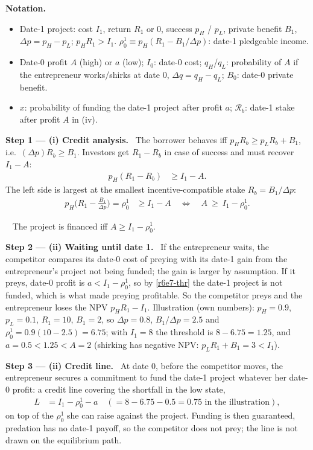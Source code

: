 \documentclass[11pt,a4paper]{article}
\newcommand{\notation}{\par\noindent\textbf{Notation.}}
\newcommand{\step}[2]{\par\medskip\noindent\textbf{Step #1 --- #2.}~}
\newcommand{\answer}[1]{\par\smallskip\noindent\fbox{\textbf{Answer #1.}}~}
\begin{document}
\notation
\begin{itemize}
  \item Date-1 project: cost $I_1$, return $R_1$ or 0, success $p_H$ / $p_L$, private benefit $B_1$, $\Delta p=p_H-p_L$; $p_HR_1>I_1$. $\rho_0^1\equiv p_H(R_1-B_1/\Delta p)$: date-1 pledgeable income.
  \item Date-0 profit $A$ (high) or $a$ (low); $I_0$: date-0 cost; $q_H$/$q_L$: probability of $A$ if the entrepreneur works/shirks at date 0, $\Delta q=q_H-q_L$; $B_0$: date-0 private benefit.
  \item $x$: probability of funding the date-1 project after profit $a$; $\mathcal R_b$: date-1 stake after profit $A$ in (iv).
\end{itemize}

\step{1}{(i) Credit analysis} The borrower behaves iff $p_HR_b\ge p_LR_b+B_1$, i.e.\ $(\Delta p)R_b\ge B_1$. Investors get $R_1-R_b$ in case of success and must recover $I_1-A$:
\begin{align}
  p_H(R_1-R_b) &\ge I_1-A. \nonumber
\end{align}
The left side is largest at the smallest incentive-compatible stake $R_b=B_1/\Delta p$:
\begin{align}
  p_H\Big(R_1-\frac{B_1}{\Delta p}\Big) = \rho_0^1 &\ge I_1-A \quad\Longleftrightarrow\quad A\ \ge\ I_1-\rho_0^1. \label{r6e7-thr}
\end{align}
\answer{(i)} The project is financed iff $A\ge I_1-\rho_0^1$.

\step{2}{(ii) Waiting until date 1} If the entrepreneur waits, the competitor compares its date-0 cost of preying with its date-1 gain from the entrepreneur's project not being funded; the gain is larger by assumption. If it preys, date-0 profit is $a<I_1-\rho_0^1$, so by \eqref{r6e7-thr} the date-1 project is not funded, which is what made preying profitable. So the competitor preys and the entrepreneur loses the NPV $p_HR_1-I_1$. Illustration (own numbers): $p_H=0.9$, $p_L=0.1$, $R_1=10$, $B_1=2$, so $\Delta p=0.8$, $B_1/\Delta p=2.5$ and $\rho_0^1=0.9(10-2.5)=6.75$; with $I_1=8$ the threshold is $8-6.75=1.25$, and $a=0.5<1.25<A=2$ (shirking has negative NPV: $p_LR_1+B_1=3<I_1$).

\step{3}{(ii) Credit line} At date 0, before the competitor moves, the entrepreneur secures a commitment to fund the date-1 project whatever her date-0 profit: a credit line covering the shortfall in the low state,
\begin{align}
  L &= I_1-\rho_0^1-a \quad (=8-6.75-0.5=0.75 \text{ in the illustration}), \label{r6e7-L}
\end{align}
on top of the $\rho_0^1$ she can raise against the project. Funding is then guaranteed, predation has no date-1 payoff, so the competitor does not prey; the line is not drawn on the equilibrium path.
\end{document}
